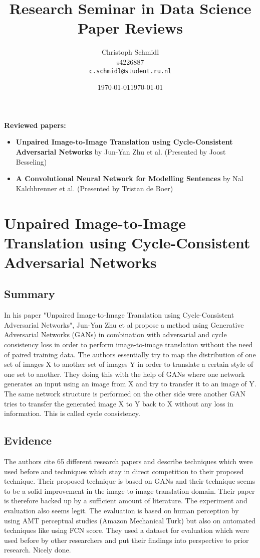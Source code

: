 \documentclass[a4paper]{article}
\title{Research Seminar in Data Science\\Paper Reviews}
\author{
  Christoph Schmidl\\ s4226887\\      \texttt{c.schmidl@student.ru.nl}
}
\date{\today}
\date{\today}
\begin{document}
\maketitle

\textbf{Reviewed papers:}

\begin{itemize}
	\item \textbf{Unpaired Image-to-Image Translation using Cycle-Consistent Adversarial Networks} by Jun-Yan Zhu et al. (Presented by Joost Besseling)
	\item \textbf{A Convolutional Neural Network for Modelling Sentences} by Nal Kalchbrenner et al. (Presented by Tristan de Boer)
\end{itemize}


\section{Unpaired Image-to-Image Translation using Cycle-Consistent Adversarial Networks}

\subsection{Summary}

In his paper "Unpaired Image-to-Image Translation using Cycle-Consistent Adversarial Networks", Jun-Yan Zhu et al propose a method using Generative Adversarial Networks (GANs) in combination with adversarial and cycle consistency loss in order to perform image-to-image translation without the need of paired training data. The authors essentially try to map the distribution of one set of images X to another set of images Y in order to translate a certain style of one set to another. They doing this with the help of GANs where one network generates an input using an image from X and try to transfer it to an image of Y. The same network structure is performed on the other side were another GAN tries to transfer the generated image X to Y back to X without any loss in information. This is called cycle consistency.

\subsection{Evidence}

The authors cite 65 different research papers and describe techniques which were used before and techniques which stay in direct competition to their proposed technique. Their proposed technique is based on GANs and their technique seems to be a solid improvement in the image-to-image translation domain. Their paper is therefore backed up by a sufficient amount of literature. The experiment and evaluation also seems legit. The evaluation is based on human perception by using AMT perceptual studies (Amazon Mechanical Turk) but also on automated techniques like using FCN score. They used a dataset for evaluation which were used before by other researchers and put their findings into perspective to prior research. Nicely done.
\end{document}
